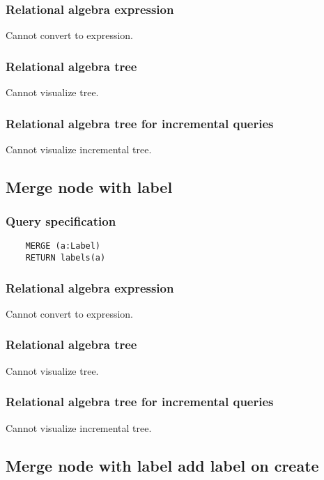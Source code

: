 	\subsubsection*{Relational algebra expression}

	Cannot convert to expression.

	\subsubsection*{Relational algebra tree}

	Cannot visualize tree.

	\subsubsection*{Relational algebra tree for incremental queries}

	Cannot visualize incremental tree.
	\subsection{Merge node with label}

	\subsubsection*{Query specification}

	\begin{lstlisting}
	MERGE (a:Label)
	RETURN labels(a)
	\end{lstlisting}


	\subsubsection*{Relational algebra expression}

	Cannot convert to expression.

	\subsubsection*{Relational algebra tree}

	Cannot visualize tree.

	\subsubsection*{Relational algebra tree for incremental queries}

	Cannot visualize incremental tree.
	\subsection{Merge node with label add label on create}

